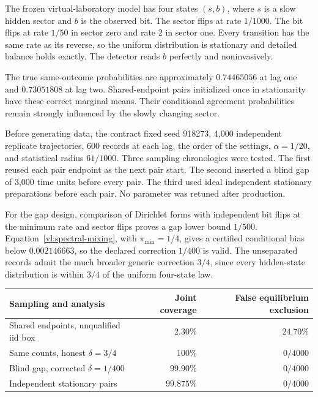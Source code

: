 The frozen virtual-laboratory model has four states $(s,b)$, where $s$ is a
slow hidden sector and $b$ is the observed bit. The sector flips at rate
$1/1000$. The bit flips at rate $1/50$ in sector zero and rate $2$ in sector
one. Every transition has the same rate as its reverse, so the uniform
distribution is stationary and detailed balance holds exactly. The detector
reads $b$ perfectly and noninvasively.

The true same-outcome probabilities are approximately $0.74465056$ at lag one
and $0.73051808$ at lag two. Shared-endpoint pairs initialized once in stationarity
have these correct marginal means. Their conditional agreement probabilities
remain strongly influenced by the slowly changing sector.

Before generating data, the contract fixed seed 918273, 4,000 independent
replicate trajectories, 600 records at each lag, the order of the settings,
$\alpha=1/20$, and statistical radius $61/1000$. Three sampling chronologies
were tested. The first reused each pair endpoint as the next pair start. The
second inserted a blind gap of 3,000 time units before every pair. The third
used ideal independent stationary preparations before each pair. No parameter
was retuned after production.

For the gap design, comparison of Dirichlet forms with independent bit flips
at the minimum rate and sector flips proves a gap lower bound $1/500$.
Equation~\eqref{vl:spectral-mixing}, with $\pi_{\min}=1/4$, gives a certified
conditional bias below $0.002146663$, so the declared correction $1/400$ is
valid. The unseparated records admit the much broader generic correction
$3/4$, since every hidden-state distribution is within $3/4$ of the uniform
four-state law.

\begin{center}
\begin{tabular}{lrr}
\hline
Sampling and analysis & Joint coverage & False equilibrium exclusion\\
\hline
Shared endpoints, unqualified iid box & $2.30\%$ & $24.70\%$\\
Same counts, honest $\delta=3/4$ & $100\%$ & $0/4000$\\
Blind gap, corrected $\delta=1/400$ & $99.90\%$ & $0/4000$\\
Independent stationary pairs & $99.875\%$ & $0/4000$\\
\hline
\end{tabular}
\end{center}

